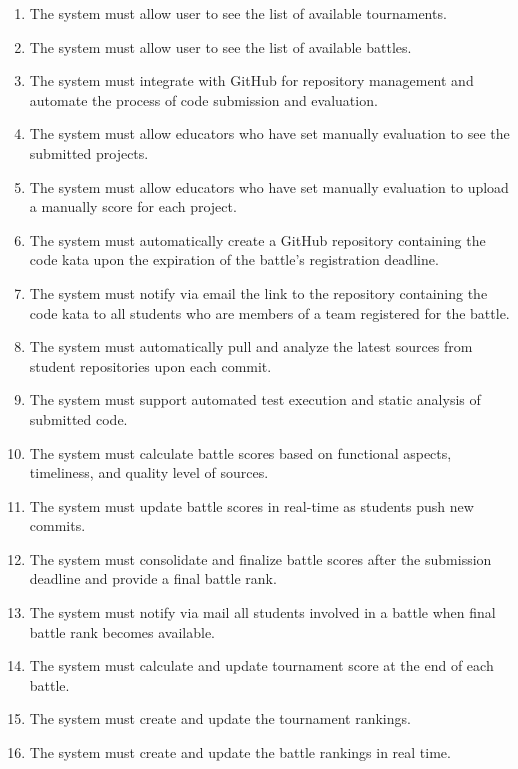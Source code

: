 \begin{enumerate}[label=\bfseries R\arabic*]
    \item The system must allow user to see the list of available tournaments.
    \item The system must allow user to see the list of available battles.
    
    \item The system must integrate with GitHub for repository management and automate the process of code submission and evaluation.

    \item The system must allow educators who have set manually evaluation to see the submitted projects.
    \item The system must allow educators who have set manually evaluation to upload a manually score for each project. 
    
    \item The system must automatically create a GitHub repository containing the code kata upon the expiration of the battle's registration deadline.
    \item The system must notify via email the link to the repository containing the code kata to all students who are members of a team registered for the battle.
    
    \item The system must automatically pull and analyze the latest sources from student repositories upon each commit.
    
    \item The system must support automated test execution and static analysis of submitted code.
    
    \item The system must calculate battle  scores based on functional aspects, timeliness, and quality level of sources.

    
    \item The system must update battle scores in real-time as students push new commits.
    
    \item The system must consolidate and finalize battle scores after the submission deadline and provide a final battle rank.
    
    \item The system must notify via mail  all students involved in a battle when final battle rank becomes available.

    
    \item The system must calculate and update tournament score at the end of each battle.
    \item The system must create and update the tournament rankings.
    \item The system must create and update the battle rankings in real time.
    

\end{enumerate}
